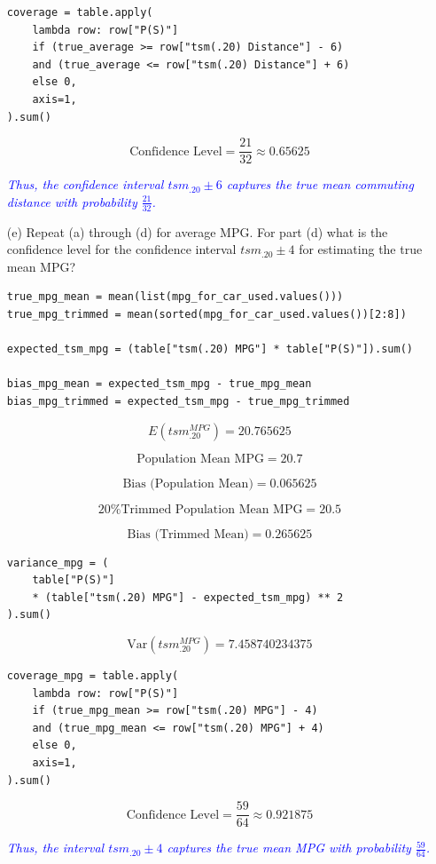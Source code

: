 \documentclass[12pt]{article}
\begin{document}
\begin{enumerate}
\begin{lstlisting}
coverage = table.apply(
    lambda row: row["P(S)"]
    if (true_average >= row["tsm(.20) Distance"] - 6)
    and (true_average <= row["tsm(.20) Distance"] + 6)
    else 0,
    axis=1,
).sum()
\end{lstlisting}

\[
\text{Confidence Level} = \frac{21}{32} \approx 0.65625
\]

\textit{\textcolor{blue}{Thus, the confidence interval $tsm_{.20} \pm 6$ captures the true mean commuting distance with probability $\frac{21}{32}$.}}

\item[(e)] Repeat (a) through (d) for average MPG. For part (d) what is the confidence level for the confidence interval $tsm_{.20} \pm 4$ for estimating the true mean MPG?

\begin{lstlisting}
true_mpg_mean = mean(list(mpg_for_car_used.values()))
true_mpg_trimmed = mean(sorted(mpg_for_car_used.values())[2:8])

expected_tsm_mpg = (table["tsm(.20) MPG"] * table["P(S)"]).sum()

bias_mpg_mean = expected_tsm_mpg - true_mpg_mean
bias_mpg_trimmed = expected_tsm_mpg - true_mpg_trimmed
\end{lstlisting}

\[
E(tsm_{.20}^{MPG}) = 20.765625
\]

\[
\text{Population Mean MPG} = 20.7
\]

\[
\text{Bias (Population Mean)} = 0.065625
\]

\[
\text{20\% Trimmed Population Mean MPG} = 20.5
\]

\[
\text{Bias (Trimmed Mean)} = 0.265625
\]

\begin{lstlisting}
variance_mpg = (
    table["P(S)"]
    * (table["tsm(.20) MPG"] - expected_tsm_mpg) ** 2
).sum()
\end{lstlisting}

\[
\text{Var}(tsm_{.20}^{MPG}) = 7.458740234375
\]

\begin{lstlisting}
coverage_mpg = table.apply(
    lambda row: row["P(S)"]
    if (true_mpg_mean >= row["tsm(.20) MPG"] - 4)
    and (true_mpg_mean <= row["tsm(.20) MPG"] + 4)
    else 0,
    axis=1,
).sum()
\end{lstlisting}

\[
\text{Confidence Level} = \frac{59}{64} \approx 0.921875
\]

\textit{\textcolor{blue}{Thus, the interval $tsm_{.20} \pm 4$ captures the true mean MPG with probability $\frac{59}{64}$.}}

\end{enumerate}
\end{document}
